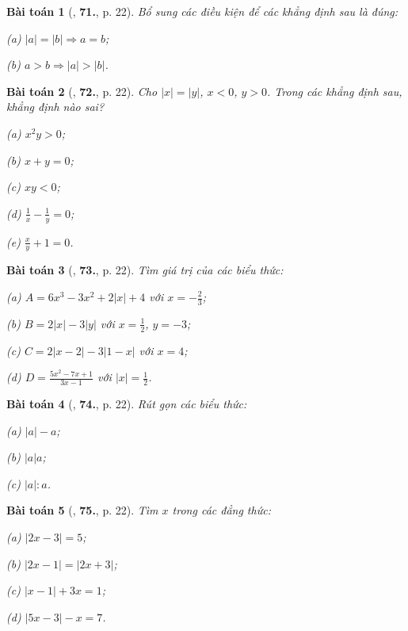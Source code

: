 \documentclass{article}
\numberwithin{equation}{section}
\newtheorem{baitoan}{Bài toán}
\begin{document}
\begin{baitoan}[\cite{Binh_Toan_7_tap_1}, \textbf{71.}, p. 22]
	Bổ sung các điều kiện để các khẳng định sau là đúng:
	\begin{enumerate*}
		\item[(a)] $|a| = |b|\Rightarrow a = b$;
		\item[(b)] $a > b\Rightarrow|a| > |b|$.
	\end{enumerate*}
\end{baitoan}

\begin{baitoan}[\cite{Binh_Toan_7_tap_1}, \textbf{72.}, p. 22]
	Cho $|x| = |y|$, $x < 0$, $y > 0$. Trong các khẳng định sau, khẳng định nào sai?
	\begin{enumerate*}
		\item[(a)] $x^2y > 0$;
		\item[(b)] $x + y = 0$;
		\item[(c)] $xy < 0$;
		\item[(d)] $\frac{1}{x} - \frac{1}{y} = 0$;
		\item[(e)] $\frac{x}{y} + 1 = 0$.
	\end{enumerate*}
\end{baitoan}

\begin{baitoan}[\cite{Binh_Toan_7_tap_1}, \textbf{73.}, p. 22]
	Tìm giá trị của các biểu thức:
	\begin{enumerate*}
		\item[(a)] $A = 6x^3 - 3x^2 + 2|x| + 4$ với $x = -\frac{2}{3}$;
		\item[(b)] $B = 2|x| - 3|y|$ với $x = \frac{1}{2}$, $y = -3$;
		\item[(c)] $C = 2|x - 2| - 3|1 - x|$ với $x = 4$;
		\item[(d)] $D = \frac{5x^2 - 7x + 1}{3x - 1}$ với $|x| = \frac{1}{2}$.
	\end{enumerate*}
\end{baitoan}

\begin{baitoan}[\cite{Binh_Toan_7_tap_1}, \textbf{74.}, p. 22]
	Rút gọn các biểu thức:
	\begin{enumerate*}
		\item[(a)] $|a| - a$;
		\item[(b)] $|a|a$;
		\item[(c)] $|a|:a$.
	\end{enumerate*}
\end{baitoan}

\begin{baitoan}[\cite{Binh_Toan_7_tap_1}, \textbf{75.}, p. 22]
	Tìm $x$ trong các đẳng thức:
	\begin{enumerate*}
		\item[(a)] $|2x - 3| = 5$;
		\item[(b)] $|2x - 1| = |2x + 3|$;
		\item[(c)] $|x - 1| + 3x = 1$;
		\item[(d)] $|5x - 3| - x = 7$.
	\end{enumerate*}
\end{baitoan}
\end{document}
